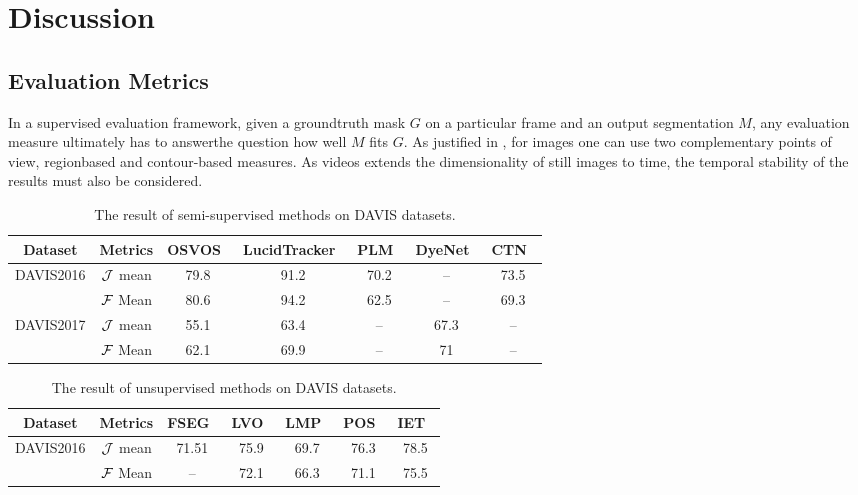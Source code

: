 \section{Discussion}

\subsection{Evaluation Metrics}
In a supervised evaluation framework, given a groundtruth mask $G$ on a particular frame and an output segmentation $M$,
any evaluation measure ultimately has to answerthe question how well $M$ fits $G$. As justified in \cite{pont2016supervised}, 
for images one can use two complementary points of view, regionbased and contour-based measures. As videos extends the
dimensionality of still images to time, the temporal stability of the results must also be considered.

\begin{table*}[ht]
	\begin{center}
		\setlength\tabcolsep{3pt}
		\begin{tabular}{|c|c|c|c|c|c|c|}
		\hline
Dataset& Metrics &OSVOS~\cite{OSVOS}  &LucidTracker~\cite{LucidTracker} &PLM~\cite{PLM} & DyeNet~\cite{DyeNet} &CTN~\cite{CTN}\\
\hline
\multirow{2}{*}{DAVIS2016} &$\mathcal{J}$ mean  &79.8   &91.2     &70.2      &--    &73.5\\
\cline{2-7}
&$\mathcal{F}$ Mean      &80.6    &94.2  &62.5  &--  &69.3\\
\hline
\multirow{2}{*}{DAVIS2017} &$\mathcal{J}$ mean  &55.1   &63.4     &--      &67.3    &--\\
\cline{2-7}
&$\mathcal{F}$ Mean      &62.1    &69.9  &--        &71      &--\\
\hline
\end{tabular}
\end{center}
\caption{The result of semi-supervised methods on DAVIS datasets.}
\label{table:semisuperivsed_all_dataset}
\end{table*}

\begin{table*}[ht]
	\begin{center}
		\setlength\tabcolsep{3pt}
		\begin{tabular}{|c|c|c|c|c|c|c|}
		\hline
Dataset& Metrics &FSEG~\cite{Jain2017FusionSeg}  &LVO~\cite{Tokmakov2017Learning} &LMP~\cite{Tokmakov2017Learning} & POS~\cite{Koh2017Primary} &IET~\cite{li2018instance}\\
\hline
\multirow{2}{*}{DAVIS2016} &$\mathcal{J}$ mean  &71.51   &75.9     &69.7       &76.3    &78.5\\
\cline{2-7}
&$\mathcal{F}$ Mean      &   --    &72.1  &66.3        &71.1      &75.5\\
\hline
\end{tabular}
\end{center}
\caption{The result of unsupervised methods on DAVIS datasets.}
\label{table:unsuperivsed_all_dataset}
\end{table*}




